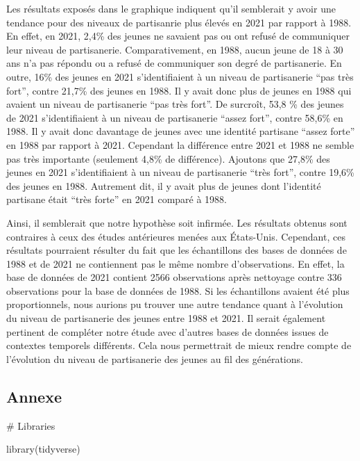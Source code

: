 \documentclass[
  letterpaper,
  DIV=11,
  numbers=noendperiod]{scrartcl}
\newenvironment{Shaded}{\begin{snugshade}}{\end{snugshade}}
\newcommand{\CommentTok}[1]{\textcolor[rgb]{0.37,0.37,0.37}{#1}}
\newcommand{\FunctionTok}[1]{\textcolor[rgb]{0.28,0.35,0.67}{#1}}
\newcommand{\NormalTok}[1]{\textcolor[rgb]{0.00,0.23,0.31}{#1}}
\begin{document}
Les résultats exposés dans le graphique indiquent qu'il semblerait y
avoir une tendance pour des niveaux de partisanrie plus élevés en 2021
par rapport à 1988. En effet, en 2021, 2,4\% des jeunes ne savaient pas
ou ont refusé de communiquer leur niveau de partisanerie.
Comparativement, en 1988, aucun jeune de 18 à 30 ans n'a pas répondu ou
a refusé de communiquer son degré de partisanerie. En outre, 16\% des
jeunes en 2021 s'identifiaient à un niveau de partisanerie ``pas très
fort'', contre 21,7\% des jeunes en 1988. Il y avait donc plus de jeunes
en 1988 qui avaient un niveau de partisanerie ``pas très fort''. De
surcroît, 53,8 \% des jeunes de 2021 s'identifiaient à un niveau de
partisanerie ``assez fort'', contre 58,6\% en 1988. Il y avait donc
davantage de jeunes avec une identité partisane ``assez forte'' en 1988
par rapport à 2021. Cependant la différence entre 2021 et 1988 ne semble
pas très importante (seulement 4,8\% de différence). Ajoutons que 27,8\%
des jeunes en 2021 s'identifiaient à un niveau de partisanerie ``très
fort'', contre 19,6\% des jeunes en 1988. Autrement dit, il y avait plus
de jeunes dont l'identité partisane était ``très forte'' en 2021 comparé
à 1988.

Ainsi, il semblerait que notre hypothèse soit infirmée. Les résultats
obtenus sont contraires à ceux des études antérieures menées aux
États-Unis. Cependant, ces résultats pourraient résulter du fait que les
échantillons des bases de données de 1988 et de 2021 ne contiennent pas
le même nombre d'observations. En effet, la base de données de 2021
contient 2566 observations après nettoyage contre 336 observations pour
la base de données de 1988. Si les échantillons avaient été plus
proportionnels, nous aurions pu trouver une autre tendance quant à
l'évolution du niveau de partisanerie des jeunes entre 1988 et 2021. Il
serait également pertinent de compléter notre étude avec d'autres bases
de données issues de contextes temporels différents. Cela nous
permettrait de mieux rendre compte de l'évolution du niveau de
partisanerie des jeunes au fil des générations.

\hypertarget{annexe}{%
\subsection{Annexe}\label{annexe}}

\begin{Shaded}
\begin{Highlighting}[]
\CommentTok{\# Libraries}

\FunctionTok{library}\NormalTok{(tidyverse)}
\end{Highlighting}
\end{Shaded}
\end{document}
